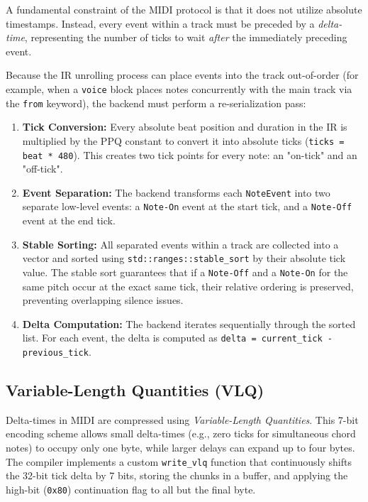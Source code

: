 A fundamental constraint of the MIDI protocol is that it does not utilize absolute timestamps.
Instead, every event within a track must be preceded by a \textit{delta-time}, representing the number of
ticks to wait \textit{after} the immediately preceding event.

Because the IR unrolling process can place events into the track out-of-order (for example, when a
\texttt{voice} block places notes concurrently with the main track via the \texttt{from} keyword), the
backend must perform a re-serialization pass:
\begin{enumerate}
  \item \textbf{Tick Conversion:} Every absolute beat position and duration in the IR is multiplied by the
    PPQ constant to convert it into absolute ticks (\texttt{ticks = beat * 480}). This creates two tick
    points for every note: an "on-tick" and an "off-tick".
  \item \textbf{Event Separation:} The backend transforms each \texttt{NoteEvent} into two separate low-level
    events: a \texttt{Note-On} event at the start tick, and a \texttt{Note-Off} event at the end tick.
  \item \textbf{Stable Sorting:} All separated events within a track are collected into a vector and sorted
    using \texttt{std::ranges::stable\_sort} by their absolute tick value. The stable sort guarantees that if
    a \texttt{Note-Off} and a \texttt{Note-On} for the same pitch occur at the exact same tick, their
    relative ordering is preserved, preventing overlapping silence issues.
  \item \textbf{Delta Computation:} The backend iterates sequentially through the sorted list. For each
    event, the delta is computed as \texttt{delta = current\_tick - previous\_tick}.
\end{enumerate}

\subsection{Variable-Length Quantities (VLQ)}

Delta-times in MIDI are compressed using \textit{Variable-Length Quantities}.
This 7-bit encoding scheme allows small delta-times (e.g., zero ticks for simultaneous chord notes) to occupy
only one byte, while larger delays can expand up to four bytes.
The compiler implements a custom \texttt{write\_vlq} function that continuously shifts the 32-bit tick delta
by 7 bits, storing the chunks in a buffer, and applying the high-bit (\texttt{0x80}) continuation flag to all
but the final byte.

